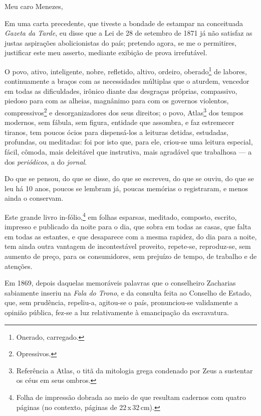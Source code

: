 {Meu caro Menezes,

Em uma carta precedente, que tiveste a bondade de estampar na
conceituada \emph{Gazeta da Tarde}, eu disse que a Lei de 28 de setembro
de 1871 já não satisfaz as justas aspirações abolicionistas do país;
pretendo agora, se me o permitires, justificar este meu asserto,
mediante exibição de prova irrefutável.

O povo, ativo, inteligente, nobre, refletido, altivo, ordeiro,
oberado\footnote{Onerado, carregado.} de labores, continuamente a
braços com as necessidades múltiplas que o aturdem, vencedor em todas as
dificuldades, irônico diante das desgraças próprias, compassivo, piedoso
para com as alheias, magnânimo para com os governos violentos,
compressivos\footnote{Opressivos.} e desorganizadores dos seus
direitos; o povo, Atlas\footnote{Referência a Atlas, o titã da
  mitologia grega condenado por Zeus a sustentar os céus em seus ombros.}
dos tempos modernos, sem fábula, sem figura, entidade que assombra, e
faz estremecer tiranos, tem poucos ócios para dispensá-los a leituras
detidas, estudadas, profundas, ou meditadas: foi por isto que, para ele,
criou-se uma leitura especial, fácil, cômoda, mais deleitável que
instrutiva, mais agradável que trabalhosa --- a dos \emph{periódicos},
a do \emph{jornal}.

Do que se pensou, do que se disse, do que se escreveu, do que se ouviu,
do que se leu há 10 anos, poucos se lembram já, poucas memórias o
registraram, e menos ainda o conservam.

Este grande livro in-fólio,\footnote{
  Folha de impressão dobrada ao meio de que resultam cadernos com quatro páginas (no
  contexto, páginas de 22\,x\,32\,cm).} em folhas esparsas, meditado,
composto, escrito, impresso e publicado da noite para o dia, que sobra
em todas as casas, que falta em todas as estantes, e que desaparece com
a mesma rapidez, do dia para a noite, tem ainda outra vantagem de
incontestável proveito, repete-se, reproduz-se, sem aumento de preço,
para os consumidores, sem prejuízo de tempo, de trabalho e de atenções.

Em 1869, depois daquelas memoráveis palavras que o conselheiro Zacharias
sabiamente inseriu na \emph{Fala do Trono}, e da consulta feita ao
Conselho de Estado, que, sem prudência, repeliu-a, agitou-se o país,
pronunciou-se validamente a opinião pública, fez-se a luz relativamente
à emancipação da escravatura.

}
